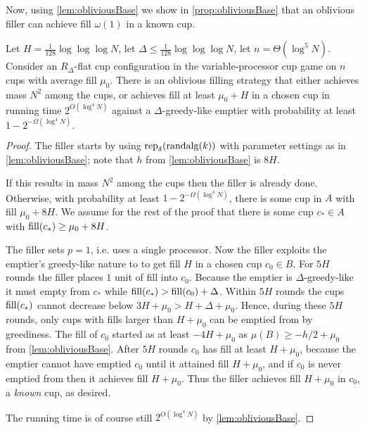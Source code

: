 Now, using \cref{lem:obliviousBase} we show in
\cref{prop:obliviousBase} that an oblivious filler can achieve
fill $\omega(1)$ in a known cup. 
\begin{proposition}
  \label{prop:obliviousBase}
  Let $H = \frac{1}{128}\log\log\log N$, let $\Delta \le
  \frac{1}{128}\log\log\log N$, let $n = \Theta(\log^5 N)$. 
  Consider an $R_\Delta$-flat cup configuration in the
  variable-processor cup game on $n$ cups with average fill $\mu_0$.
  There is an oblivious filling strategy that either
  achieves mass $N^2$ among the cups, or achieves fill at least $\mu_0 + H$
  in a chosen cup in running time $2^{O(\log^4 N)}$ against a
  $\Delta$-greedy-like emptier with probability at least
  $1-2^{-\Omega(\log^4 N)}.$
\end{proposition}
\begin{proof}
  The filler starts by using $\operatorname{\text{\textup{rep}}}_\delta(\operatorname{\text{\textup{randalg}}}(k))$ with
  parameter settings as in \cref{lem:obliviousBase};
  note that $h$ from \cref{lem:obliviousBase} is $8H$.

  If this results in mass $N^2$ among the cups then the filler is
  already done. Otherwise, with probability at least
  $1-2^{-\Omega(\log^4 N)}$, there is some cup in $A$ with fill
  $\mu_0 + 8H$. We assume for the rest of the proof that there is
  some cup $c_* \in A$ with $\operatorname{\text{\textup{fill}}}(c_*) \ge \mu_0 + 8H$.

  The filler sets $p=1$, i.e. uses a single processor. Now the
  filler exploits the emptier's greedy-like nature to to get fill
  $H$ in a chosen cup $c_0 \in B$. For $5H$ rounds
  the filler places $1$ unit of fill into $c_0$. Because the
  emptier is $\Delta$-greedy-like it must empty from $c_*$ 
  while $\operatorname{\text{\textup{fill}}}(c_*) > \operatorname{\text{\textup{fill}}}(c_0) + \Delta$. Within $5H$ rounds
  the cups $\operatorname{\text{\textup{fill}}}(c_*)$ cannot decrease below $3H+\mu_0 > H + \Delta + \mu_0$.
  Hence, during these $5H$ rounds, only cups with fills larger
  than $H + \mu_0$ can be emptied from by greediness. 
  The fill of $c_0$ started as at least
  $-4H+\mu_0$ as $\mu(B) \ge -h/2+\mu_0$ from
  \cref{lem:obliviousBase}. After $5H$ rounds
  $c_0$ has fill at least $H+\mu_0$, because the emptier cannot
  have emptied $c_0$ until it attained fill $H+\mu_0$, and if
  $c_0$ is never emptied from then it achieves fill $H+\mu_0$.
  Thus the filler achieves fill $H+\mu_0$
  in $c_0$, a \emph{known} cup, as desired.

  The running time is of course still $2^{O(\log^4 N)}$ by
  \cref{lem:obliviousBase}.
\end{proof}

